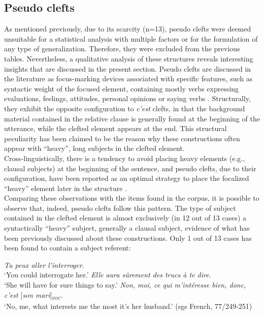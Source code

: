 \subsection{Pseudo clefts}
As mentioned previously, due to its scarcity (n=13), pseudo clefts were deemed unsuitable for a statistical analysis with multiple factors or for the formulation of any type of generalization. Therefore, they were excluded from the previous tables. Nevertheless, a qualitative analysis of these structures reveals interesting insights that are discussed in the present section.
Pseudo clefts are discussed in the literature as focus-marking devices associated with specific features, such as syntactic weight of the focused element, containing mostly verbs expressing evaluations, feelings, attitudes, personal opinions or saying verbs \parencite{apotheloz2012pseudo}. Structurally, they exhibit the opposite configuration to \textit{c'est} clefts, in that the background material contained in the relative clause is generally found at the beginning of the utterance, while the clefted element appears at the end. This structural peculiarity has been  claimed to be the reason why these constructions often appear with ``heavy'', long subjects in the clefted element. \\
Cross-linguistically, there is a tendency to avoid placing heavy elements (e.g., clausal subjects) at the beginning of the sentence, and pseudo clefts, due to their configuration, have been reported as an optimal strategy to place the focalized ``heavy” element later in the structure \parencite{prince1978comparison, blanche1990franccais, roubaud2000constructions, calude2009cleft,  apotheloz2012pseudo}. \\
Comparing these observations with the items found in the corpus, it is possible to observe that, indeed, pseudo clefts follow this pattern. The type of subject contained in the clefted element is almost exclusively (in 12 out of 13 cases) a syntactically ``heavy” subject, generally a clausal subject, evidence of what has been previously discussed about these constructions. Only 1 out of 13 cases has been found to contain a subject referent:

\ea \label{ex:5:85}
\ea \textit{Tu peux aller l'interroger}.\\
`You could interrogate her.'
 \textit{Elle aura sûrement des trucs à te dire}.\\
`She will have for sure things to say.'
\ex \textit{Non, moi, ce qui m'intéresse bien, donc, c'est} {[\textit{son mari}]\textsubscript{\textsc{foc}}}\normalsize.\\
`No, me, what interests me the most it's her husband.' \hfill (sgs French, 77/249-251)   
\z \z


